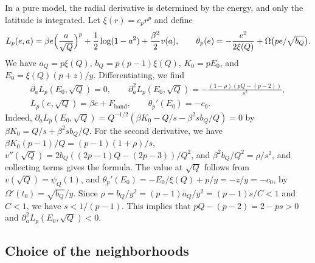 In a pure model, the radial derivative is determined by the energy, and only the latitude is integrated. Let $\xi(r)=c_pr^p$ and define
\begin{equation}\label{eq:mb-Lp}
L_p(e,a)=\beta e\Bigl(\frac a{\sqrt Q}\Bigr)^p+\frac12\log(1-a^2)+\frac{\beta^2}2v(a),\qquad \theta_p(e)=-\frac{e^2}{2\xi(Q)}+\Omega\bigl(pe/\sqrt{b_Q}\bigr).
\end{equation}
We have $a_Q=p\xi(Q)$, $b_Q=p(p-1)\xi(Q)$, $K_0=pE_0$, and $E_0=\xi(Q)(p+z)/y$. Differentiating, we find
\begin{equation}\label{eq:mb-pure-derivs}
\begin{gathered}
\partial_aL_p(E_0,\sqrt Q)=0,\qquad\partial_a^2L_p(E_0,\sqrt Q)=-\frac{(1-\rho)(pQ-(p-2))}{s^2},\\
L_p(e,\sqrt Q)=\beta e+F_{\mathrm{band}},\qquad\theta_p'(E_0)=-c_0 .
\end{gathered}
\end{equation}
Indeed, $\partial_aL_p(E_0,\sqrt Q)=Q^{-1/2}(\beta K_0-Q/s-\beta^2sb_Q/Q)=0$ by $\beta K_0=Q/s+\beta^2sb_Q/Q$. For the second derivative, we have $\beta K_0(p-1)/Q=(p-1)(1+\rho)/s$, $v''(\sqrt Q)=2b_Q((2p-1)Q-(2p-3))/Q^2$, and $\beta^2b_Q/Q^2=\rho/s^2$, and collecting terms gives the formula. The value at $\sqrt Q$ follows from $v(\sqrt Q)=\psi_Q(1)$, and $\theta_p'(E_0)=-E_0/\xi(Q)+p/y=-z/y=-c_0$, by $\Omega'(t_0)=\sqrt{b_Q}/y$. Since $\rho=b_Q/y^2=(p-1)a_Q/y^2=(p-1)s/C<1$ and $C<1$, we have $s<1/(p-1)$. This implies that $pQ-(p-2)=2-ps>0$ and $\partial_a^2L_p(E_0,\sqrt Q)<0$.

\subsection{Choice of the neighborhoods}\label{sec:mb-choice}

